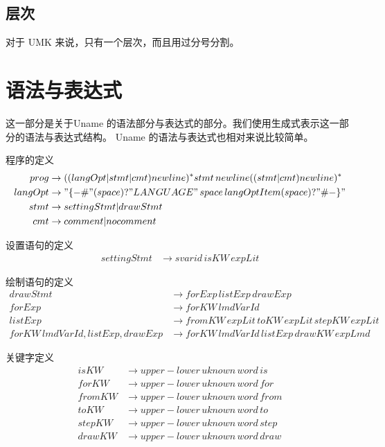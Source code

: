 \documentclass{ctexart}
\begin{document}
\subsection{层次}
\label{sec:lexical:layout}
对于 UMK 来说，只有一个层次，而且用过分号分割。

\section{语法与表达式}
\label{sec:exp}
这一部分是关于Uname 的语法部分与表达式的部分。我们使用生成式表示这一部分的语法与表达式结构。
Uname 的语法与表达式也相对来说比较简单。

程序的定义
\begin{align*}
prog &\rightarrow ((langOpt|stmt|cmt)newline)^*stmt\,newline((stmt|cmt)newline)^* \\
langOpt &\rightarrow "\{-\#"(space)?"LANGUAGE"\,space\,langOptItem(space)?"\#-\}" \\
stmt &\rightarrow settingStmt|drawStmt \\
cmt &\rightarrow comment|nocomment
\end{align*}

设置语句的定义
\begin{align*}
settingStmt &\rightarrow svarid\,isKW\,expLit
\end{align*}

绘制语句的定义
\begin{align*}
drawStmt &\rightarrow forExp\,listExp\,drawExp \\
forExp &\rightarrow forKW\,lmdVarId \\
listExp &\rightarrow fromKW\,expLit\,toKW\,expLit\,stepKW\,expLit \\
forKW\,lmdVarId,listExp,drawExp &\rightarrow forKW\,lmdVarId\,listExp\,drawKW\,expLmd
\end{align*}

关键字定义
\begin{align*}
isKW &\rightarrow \mathit{upper-lower\,uknown\,word\,is} \\
forKW &\rightarrow \mathit{upper-lower\,uknown\,word\,for} \\
fromKW &\rightarrow \mathit{upper-lower\,uknown\,word\,from} \\
toKW &\rightarrow \mathit{upper-lower\,uknown\,word\,to} \\
stepKW &\rightarrow \mathit{upper-lower\,uknown\,word\,step} \\
drawKW &\rightarrow \mathit{upper-lower\,uknown\,word\,draw}
\end{align*}
\end{document}
